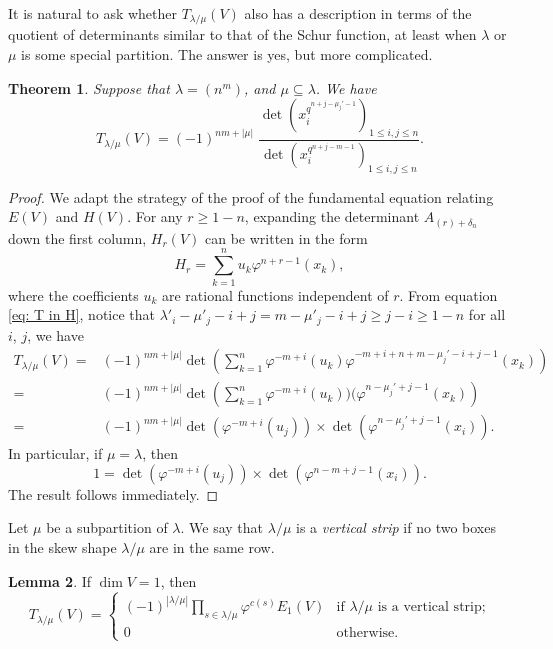 \documentclass[12pt,a4paper]{report}
\newtheorem{theorem}{Theorem}[chapter]
\theoremstyle{definition}
\newtheorem{lemma}[theorem]{Lemma}
\theoremstyle{remark}
\theoremstyle{definition}
\begin{document}
It is natural to ask whether $T_{\lambda/\mu}(V)$ also has a description in terms of the quotient of determinants similar to that of the Schur function, at least when $\lambda$ or $\mu$ is some special partition. The answer is yes, but more complicated. 
 \begin{theorem}\label{thm:T_as_determinant} 
 Suppose that $\lambda = (n^m)$, and $\mu\subseteq \lambda$. We have
 \begin{equation*}
 T_{\lambda/\mu} (V) = (-1)^{nm + |\mu|} \; \frac{\det ( x_i^{q^{n+j-\mu_j' -1}})_{1\leq i, j\leq n}}{\det (x_i^{q^{n+j-m -1}})_{1\leq i, j\leq n}}. 
 \end{equation*}  
 \end{theorem}
\begin{proof}
 We adapt the strategy of the proof of the fundamental equation relating $E(V)$ and $H(V)$. For any $r\geq 1-n$, expanding the determinant $A_{(r) + \delta_{n}}$ down the first column, $H_r (V)$ can be written in the form
 \begin{equation*}
 H_r = \sum_{k=1}^n u_k \varphi^{n+r-1} (x_k), 
 \end{equation*}
 where the coefficients $u_k$ are rational functions independent of $r$. From equation \eqref{eq: T in H}, notice that $\lambda'_i - \mu'_j - i + j = m-\mu'_j-i+j\geq j-i\geq 1-n$ for all $i$, $j$, we have
 \begin{align*}
   T_{\lambda/\mu}(V) =& (-1)^{nm + |\mu|}\det\left( \sum_{k=1}^n \varphi^{-m +i} (u_k)  \varphi^{-m +i+ n+m - \mu_j' - i +j-1} (x_k)\right)\\
   =&  (-1)^{nm + |\mu|}\det\left(\sum_{k=1}^n \varphi^{-m +i} (u_k))   (\varphi^{n - \mu_j'+j-1} (x_k)\right)\\
   =& (-1)^{nm + |\mu|}\det (\varphi^{-m +i} (u_j)) \times \det (\varphi^{n - \mu_j'+j-1} (x_i)).
 \end{align*}
In particular, if $\mu = \lambda$, then 
\begin{equation*}
1 = \det ( \varphi^{-m +i} (u_j)) \times \det (\varphi^{n - m+j-1} (x_i)). 
\end{equation*}
The result follows immediately. 
\end{proof} 
Let $\mu$ be a subpartition of $\lambda$. We say that $\lambda/\mu$ is a \emph{vertical strip} if no two boxes in the skew shape $\lambda/\mu$ are in the same row.
\begin{lemma}\label{vertical_strip} 
    If $\dim V = 1$, then 
    \begin{equation*}
    T_{\lambda/\mu}(V) =
    \begin{cases}
   (-1)^{|\lambda/\mu|} \prod_{s \in \lambda/\mu} \varphi^{c(s)} E_1(V) & \text{if $\lambda/\mu$ is a vertical strip;}\\
   0 & \text{otherwise.} 
    \end{cases}
    \end{equation*}
\end{lemma}
\end{document}
